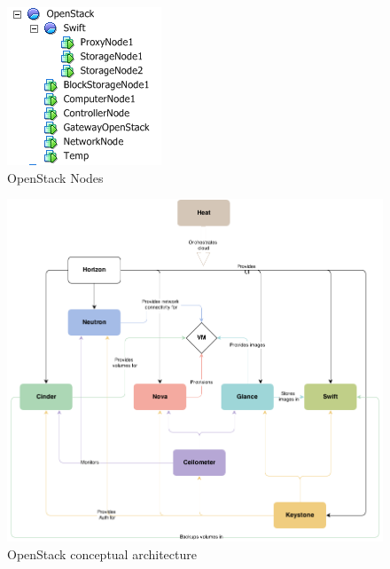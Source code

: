 \begin{figure}[ht!]
\centering
\includegraphics{openstack_tree.png}
\caption{OpenStack Nodes}
\label{overflow}
\end{figure}


\begin{figure}[ht!]
\centering
\includegraphics[width=\textwidth]{openstack_conceptual_architecture.png}
\caption{OpenStack conceptual architecture}
\label{overflow}
\end{figure}


